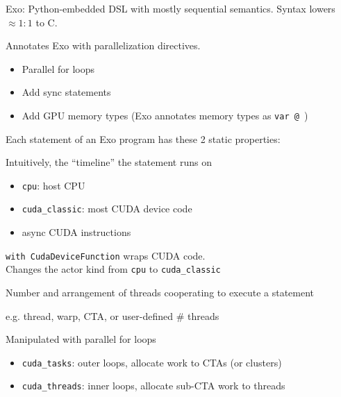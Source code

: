 \begin{minipage}[t]{0.48\textwidth}\fixminipage

Exo: Python-embedded DSL with mostly sequential semantics.
Syntax lowers $\approx 1:1$ to C.

Annotates Exo with parallelization directives.


\begin{itemize}
  \item Parallel for loops
  \item Add sync statements
  \item Add GPU memory types (Exo annotates memory types as \texttt{var @ })
\end{itemize}
\end{minipage}
\hfill
\begin{minipage}[t]{0.48\textwidth}\fixminipage

Each statement of an Exo program has these 2 static properties:


Intuitively, the ``timeline'' the statement runs on
\begin{itemize}
  \item \texttt{cpu}: host CPU
  \item \texttt{cuda\_classic}: most CUDA device code
  \item async CUDA instructions
\end{itemize}
\texttt{with CudaDeviceFunction} wraps CUDA code.\\
Changes the actor kind from \texttt{cpu} to \texttt{cuda\_classic}


Number and arrangement of threads cooperating to execute a statement

e.g. thread, warp, CTA, or user-defined \# threads

Manipulated with parallel for loops

\begin{itemize}
  \item \texttt{cuda\_tasks}: outer loops, allocate work to CTAs (or clusters)
  \item \texttt{cuda\_threads}: inner loops, allocate sub-CTA work to threads
\end{itemize}
\end{minipage}

